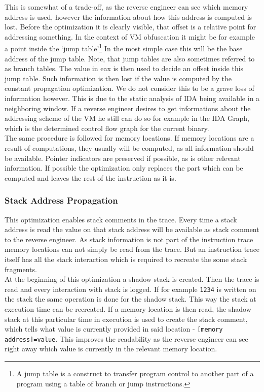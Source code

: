 \documentclass[10pt,twoside,a4paper,bibliography=totoc]{scrbook}
\newcommand{\code}[1]{\texttt{#1}}
\begin{document}
This is somewhat of a trade-off, as the reverse engineer can see which memory address is used, however the information about how this address is computed is lost.
Before the optimization it is clearly visible, that offset is a relative point for addressing something. In the context of VM obfuscation it might be for example a point inside the `jump table'\footnote{A jump table is a construct to transfer program control to another part of a program using a table of branch or jump instructions.} 
In the most simple case this will be the base address of the jump table. Note, that jump tables are also sometimes referred to as branch tables. 
The value in eax is then used to decide an offset inside this jump table. Such information is then lost if the value is computed by the constant propagation optimization.
We do not consider this to be a grave loss of information however. This is due to the static analysis of IDA being available in a neighboring window. If a reverse engineer desires to get informations about the addressing scheme of the VM he still can do so for example in the IDA Graph, which is the determined control flow graph for the current binary. \\
The same procedure is followed for memory locations. If memory locations are a result of computations, they usually will be computed, as all information should be available.
Pointer indicators are preserved if possible, as is other relevant information. 
If possible the optimization only replaces the part which can be computed and leaves the rest of the instruction as it is.


\subsubsection{Stack Address Propagation}
This optimization enables stack comments in the trace. Every time a stack address is read the value on that stack address will be available as stack comment to the reverse engineer.
As stack information is not part of the instruction trace memory locations can not simply be read from the trace. But an instruction trace itself has all the stack interaction which is required to recreate the some stack fragments.\\
At the beginning of this optimization a shadow stack is created. 
Then the trace is read and every interaction with stack is logged. If for example \code{1234} is written on the stack the same operation is done for the shadow stack. This way the stack at execution time can be recreated.
If a memory location is then read, the shadow stack at this particular time in execution is used to create the stack comment, which tells what value is currently provided in said location - \code{[memory address]=value}.
This improves the readability as the reverse engineer can see right away which value is currently in the relevant memory location.
\end{document}
